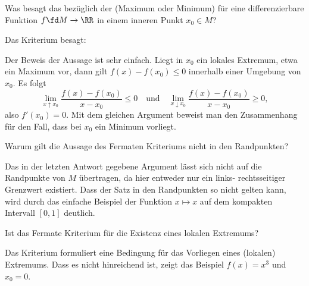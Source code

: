 \begin{frage}\label{06_ferm}
Was besagt das  bezüglich der  
 (Maximum oder Minimum) für eine 
differenzierbare Funktion $f\fd M\to \RR$ in einem 
inneren Punkt $x_0 \in M$? 
\end{frage}

\begin{antwort}
Das Kriterium besagt:  

Der Beweis der Aussage ist sehr einfach. Liegt in $x_0$ ein lokales 
Extremum, etwa ein Maximum vor, dann gilt $f(x)-f(x_0)\le 0$ 
innerhalb einer Umgebung von $x_0$. Es folgt
\[
\lim_{x\uparrow x_0}\frac{f(x)-f(x_0)}{x-x_0} \le 0  \quad\text{und}\quad
\lim_{x\downarrow x_0}\frac{f(x)-f(x_0)}{x-x_0} \ge 0, 
\]
also $f'(x_0)=0$. 
Mit dem gleichen Argument beweist man den Zusammenhang für den 
Fall, dass bei $x_0$ ein Minimum vorliegt. \AntEnd
\end{antwort} 

\smallskip
\begin{frage}
Warum gilt die Aussage des Fermat\sch en Kriteriums nicht 
in den Randpunkten?
\end{frage}

\begin{antwort}
Das in der letzten Antwort gegebene Argument lässt sich nicht 
auf die Randpunkte von $M$ übertragen, 
da hier entweder nur ein links-  rechtsseitiger Grenzwert 
existiert. Dass der Satz in den Randpunkten so nicht gelten kann, wird 
durch das einfache Beispiel der Funktion $x\mapsto x$ auf dem 
kompakten Intervall $[0,1]$ deutlich. 
\AntEnd
\end{antwort}

\begin{frage}
Ist das Fermat\sch e Kriterium  
für die Existenz eines lokalen Extremums?
\end{frage}

\begin{antwort}
 
Das Kriterium formuliert eine  Bedingung 
für das Vorliegen eines (lokalen) Extremums. 
Dass es nicht hinreichend ist, zeigt das Beispiel  
$f(x)=x^3$ und $x_0=0$.
\AntEnd
\end{antwort}

